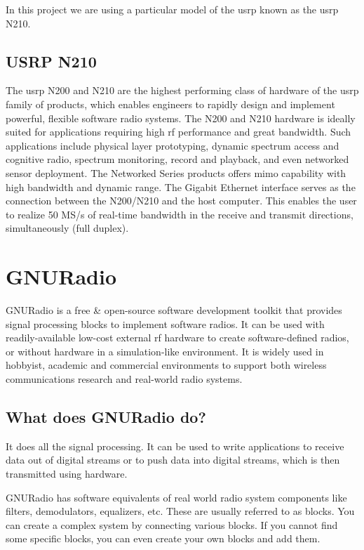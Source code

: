 In this project we are using a particular model of the \gls{usrp} known as the
\gls{usrp} N210.

\subsection{USRP N210}

The \gls{usrp} N200 and N210 are the highest performing class of hardware of the 
\gls{usrp} family of products, which enables engineers to rapidly design and 
implement powerful, flexible software radio systems. The N200 and N210 
hardware is ideally suited for applications requiring high \gls{rf} performance and
great bandwidth. Such applications include physical layer prototyping, dynamic
spectrum access and cognitive radio, spectrum monitoring, record and playback,
and even networked sensor deployment. The Networked Series products offers 
\gls{mimo} capability with high bandwidth and dynamic range. The Gigabit Ethernet
interface serves as the connection between the N200/N210 and the host 
computer. This enables the user to realize 50 MS/s of real-time bandwidth in 
the receive and transmit directions, simultaneously (full duplex).


\section{GNURadio}

GNURadio is a free \& open-source software development toolkit that provides 
signal processing blocks to implement software radios. It can be used with 
readily-available low-cost external \gls{rf} hardware to create software-defined 
radios, or without hardware in a simulation-like environment. It is widely 
used in hobbyist, academic and commercial environments to support both 
wireless communications research and real-world radio systems.

\subsection{What does GNURadio do?}
It does all the signal processing. It can be used to write applications to 
receive data out of digital streams or to push data into digital streams, 
which is then transmitted using hardware.

GNURadio has software equivalents of real world radio system components like 
filters, demodulators, equalizers, etc. These are usually referred to as
blocks. You can create a complex system by connecting various blocks. If you
cannot find some specific blocks, you can even create your own blocks and add
them.

